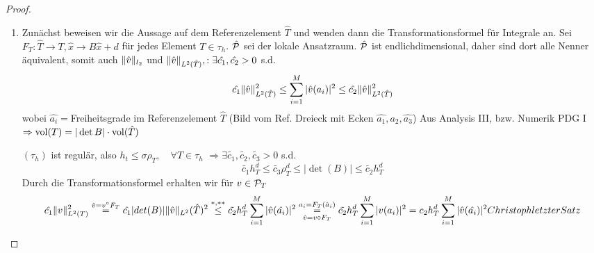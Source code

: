 \begin{proof}
  \begin{enumerate}
    \item Zunächst beweisen wir die Aussage auf dem Referenzelement $\hat{T}$ und wenden dann die Transformationsformel für Integrale an.
      Sei $F_T: \hat{T} \to T, \hat{x}\to B\hat{x}+d$ für jedes Element $T\in \tau_h$. $\hat{\mathcal{P}}$ sei der lokale Ansatzraum. $\hat{\mathcal{P}}$ ist endlichdimensional, daher sind dort alle Nenner äquivalent, somit auch $\|\hat{v}\|_{l_2}$ und $\|\hat{v}\|_{L^2(\hat{T})}, : \exists \hat{c_1}, \hat{c_2} > 0$ s.d.
      \begin{equation} %
        \hat{c_1} \norm{\hat{v}}^2_{L^2(\hat{T})} \leq \sum_{i=1}^{M} |\hat{v}(a_i)|^2 \leq \hat{c_2} \norm{\hat{v}}^2_{L^2(\hat{T})}
        \label{}
      \end{equation}
      wobei $\hat{a_i} = $Freiheitsgrade im Referenzelement $\hat{T}$ (Bild vom Ref. Dreieck mit Ecken $\hat{a_1},\hat{a_2},\hat{a_3}$)
      Aus Analysis III, bzw. Numerik PDG I $\Rightarrow \mathrm{vol}(T) = |\det B| \cdot \mathrm{vol}(\hat{T})$

      $(\tau_h)$ ist regulär, also $h_t \leq \sigma \rho_T, \quad \forall T\in \tau_h$
      $\Rightarrow \exists \tilde{c_1}, \tilde{c_2}, \tilde{c_3} >0 $ s.d. 
      \[
        \tilde{c_1} h_T^d \leq \tilde{c_3} \rho_T^d \leq |\det(B)| \leq \tilde{c_2} h_T^d \tag{$\star$}
      \]
        \label{ }
      Durch die Transformationsformel erhalten wir für $v \in \mathcal{P}_T$
      \begin{align}
        \hat{c_1} \|v\|_{L^2(T)}^2 \overset{\hat{v}=v^\circ F_T}{=} \hat{c_1} |det (B)| \|\hat{v}\|_{L^2}(\hat{T})^2 
        \overset{*,**}{\leq} \tilde{c_2} h_T^d \sum_{i=1}^{M} |\hat{v}(\hat{a_i})|^2
        \overset{a_i = F_T(\hat{a}_i)}{\underset{\hat{v}=v \circ F_T}{=}} \tilde{c_2} h_T^d \sum_{i=1}^{M}|v(a_i)|^2 = c_2 h_T^d \sum_{i=1}^{M} |\hat{v}(\hat{a_i})|^2
      Christoph letzter Satz
    \end{align}
    

\end{enumerate}
\end{proof}

